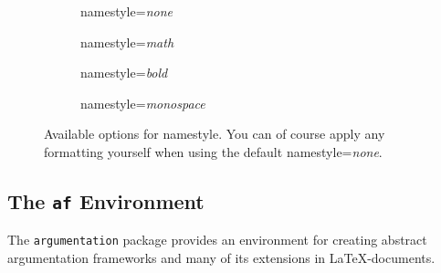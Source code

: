 \documentclass[headings=normal]{scrartcl}
\newcommand{\argumentation}{\texttt{argumentation}\xspace}
\begin{document}
\begin{figure}[!ht]
    \begin{subfigure}{0.49\textwidth}
        \centering
        \begin{af}[namestyle=none]
    
        \end{af}
        \caption{\textsf{namestyle}=\textit{none}}
        \label{fig:namestyle_none}
    \end{subfigure}
    \hfill
    \begin{subfigure}{0.49\textwidth}
        \centering
        \begin{af}[namestyle=math]
    
        \end{af}
        \caption{\textsf{namestyle}=\textit{math}}
        \label{fig:namestyle_math}
    \end{subfigure}
    \hfill
    \par\bigskip
    \begin{subfigure}{0.49\textwidth}
        \centering
        \begin{af}[namestyle=bold]
    
        \end{af}
        \caption{\textsf{namestyle}=\textit{bold}}
        \label{fig:namestyle_bold}
    \end{subfigure}
    \hfill
    \begin{subfigure}{0.49\textwidth}
        \centering
        \begin{af}[namestyle=monospace]
    
        \end{af}
        \caption{\textsf{namestyle}=\textit{monospace}}
        \label{fig:namestyle_monospace}
    \end{subfigure}
    \caption{Available options for \textsf{namestyle}. You can of course apply any formatting yourself when using the default \textsf{namestyle}=\textit{none}.}
    \label{fig:namestyle}
\end{figure}


\subsection{The \texttt{af} Environment}\label{sec:af}
The \argumentation package provides an environment for creating abstract argumentation frameworks and many of its extensions in \LaTeX-documents.\\
\end{document}
